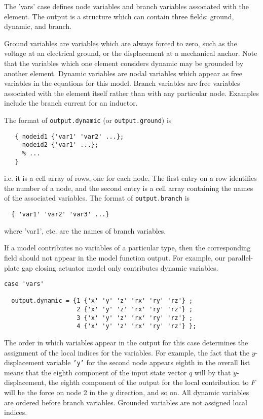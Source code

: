 The 'vars' case defines node variables and branch variables associated
with the element.  The output is a structure which can contain three
fields: ground, dynamic, and branch.

Ground variables are variables which are always forced to zero, 
such as the voltage at an electrical ground, or the displacement 
at a mechanical anchor.  Note that the variables which one element
considers dynamic may be grounded by another element. 
Dynamic variables are nodal variables which appear as free variables in 
the equations for this model.
Branch variables are free variables associated with the element itself
rather than with any particular node.  Examples include the branch
current for an inductor.

The format of \texttt{output.dynamic} (or \texttt{output.ground}) is
\begin{verbatim}
   { nodeid1 {'var1' 'var2' ...};
     nodeid2 {'var1' ...};
     % ...
   }
\end{verbatim}
i.e. it is a cell array of rows, one for each node.  The first entry
on a row identifies the number of a node, and the second entry is
a cell array containing the names of the associated variables.
The format of \texttt{output.branch} is
\begin{verbatim}
  { 'var1' 'var2' 'var3' ...}
\end{verbatim}
where 'var1', etc. are the names of branch variables.

If a model contributes no variables of a particular type, then the 
corresponding field should not appear in the model function output.
For example, our parallel-plate gap closing actuator model only 
contributes dynamic variables.
\begin{verbatim}
case 'vars'

  output.dynamic = {1 {'x' 'y' 'z' 'rx' 'ry' 'rz'} ;
                    2 {'x' 'y' 'z' 'rx' 'ry' 'rz'} ;
                    3 {'x' 'y' 'z' 'rx' 'ry' 'rz'} ;
                    4 {'x' 'y' 'z' 'rx' 'ry' 'rz'} };

\end{verbatim}

The order in which variables appear in the output for this case determines
the assignment of the local indices for the variables.  For example,
the fact that the $y$-displacement variable \texttt{'y'} for the second node
appears eighth in the overall list means that the eighth component of the
input state vector $q$ will by that $y$-displacement, the eighth component
of the output for the local contribution to $F$ will be the force on node 2
in the $y$ direction, and so on.  All dynamic variables are ordered before
branch variables.  Grounded variables are not assigned local indices.

